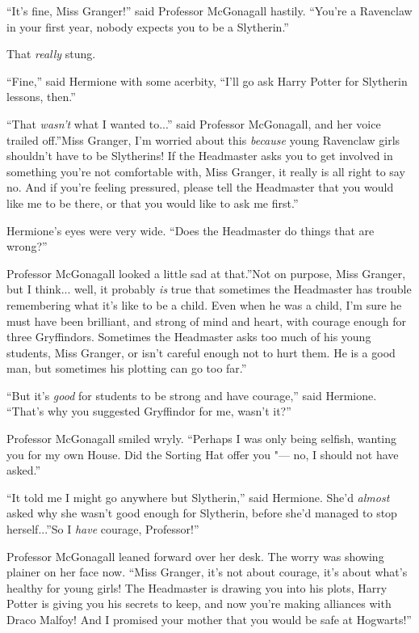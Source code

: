 ``It's fine, Miss Granger!'' said Professor McGonagall hastily. ``You're
a Ravenclaw in your first year, nobody expects you to be a Slytherin.''

That \emph{really} stung.

``Fine,'' said Hermione with some acerbity, ``I'll go ask Harry Potter
for Slytherin lessons, then.''

``That \emph{wasn't} what I wanted to...'' said Professor
McGonagall, and her voice trailed off.''Miss Granger, I'm worried about
this \emph{because} young Ravenclaw girls shouldn't have to be
Slytherins! If the Headmaster asks you to get involved in something
you're not comfortable with, Miss Granger, it really is all right to say
no. And if you're feeling pressured, please tell the Headmaster that you
would like me to be there, or that you would like to ask me first.''

Hermione's eyes were very wide. ``Does the Headmaster do things that are
wrong?''

Professor McGonagall looked a little sad at that.''Not on purpose, Miss
Granger, but I think... well, it probably \emph{is} true that
sometimes the Headmaster has trouble remembering what it's like to be a
child. Even when he was a child, I'm sure he must have been brilliant,
and strong of mind and heart, with courage enough for three Gryffindors.
Sometimes the Headmaster asks too much of his young students, Miss
Granger, or isn't careful enough not to hurt them. He is a good man, but
sometimes his plotting can go too far.''

``But it's \emph{good} for students to be strong and have courage,'' said
Hermione. ``That's why you suggested Gryffindor for me, wasn't it?''

Professor McGonagall smiled wryly. ``Perhaps I was only being selfish,
wanting you for my own House. Did the Sorting Hat offer you "--- no, I
should not have asked.''

``It told me I might go anywhere but Slytherin,'' said Hermione. She'd
\emph{almost} asked why she wasn't good enough for Slytherin, before
she'd managed to stop herself...''So I \emph{have} courage,
Professor!''

Professor McGonagall leaned forward over her desk. The worry was showing
plainer on her face now. ``Miss Granger, it's not about courage, it's
about what's healthy for young girls! The Headmaster is drawing you into
his plots, Harry Potter is giving you his secrets to keep, and now
you're making alliances with Draco Malfoy! And I promised your mother
that you would be safe at Hogwarts!''

